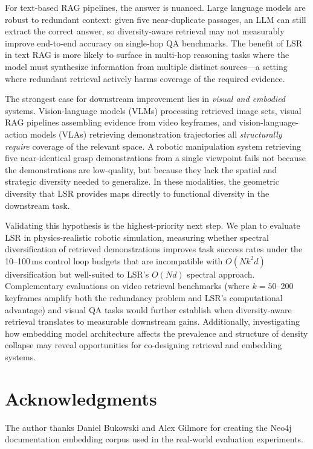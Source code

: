\documentclass{article}
\begin{document}
For text-based RAG pipelines, the answer is nuanced. Large language models are robust to redundant context: given five near-duplicate passages, an LLM can still extract the correct answer, so diversity-aware retrieval may not measurably improve end-to-end accuracy on single-hop QA benchmarks. The benefit of LSR in text RAG is more likely to surface in multi-hop reasoning tasks where the model must synthesize information from multiple distinct sources---a setting where redundant retrieval actively harms coverage of the required evidence.

The strongest case for downstream improvement lies in \emph{visual and embodied} systems. Vision-language models (VLMs) processing retrieved image sets, visual RAG pipelines assembling evidence from video keyframes, and vision-language-action models (VLAs) retrieving demonstration trajectories all \emph{structurally require} coverage of the relevant space. A robotic manipulation system retrieving five near-identical grasp demonstrations from a single viewpoint fails not because the demonstrations are low-quality, but because they lack the spatial and strategic diversity needed to generalize. In these modalities, the geometric diversity that LSR provides maps directly to functional diversity in the downstream task.

Validating this hypothesis is the highest-priority next step. We plan to evaluate LSR in physics-realistic robotic simulation, measuring whether spectral diversification of retrieved demonstrations improves task success rates under the 10--100\,ms control loop budgets that are incompatible with $O(Nk^2d)$ diversification but well-suited to LSR's $O(Nd)$ spectral approach. Complementary evaluations on video retrieval benchmarks (where $k\!=\!50$--200 keyframes amplify both the redundancy problem and LSR's computational advantage) and visual QA tasks would further establish when diversity-aware retrieval translates to measurable downstream gains. Additionally, investigating how embedding model architecture affects the prevalence and structure of density collapse may reveal opportunities for co-designing retrieval and embedding systems.

\section*{Acknowledgments}

The author thanks Daniel Bukowski and Alex Gilmore for creating the Neo4j documentation embedding corpus used in the real-world evaluation experiments.



\end{document}
